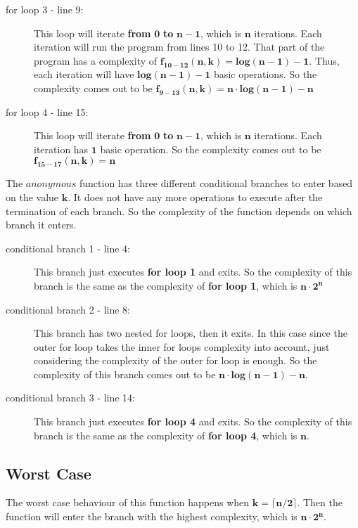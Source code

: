 \documentclass{article}
\begin{document}
\begin{description}
   \item[for loop 3 - line 9:] This loop will iterate \textbf{from} $\mathbf{0}$ \textbf{to} $\mathbf{n-1}$, which is $\mathbf{n}$ iterations. Each iteration will run the program from lines 10 to 12. That part of the program  has a complexity of $\mathbf{f_{10-12}(n,k) = log(n-1) - 1}$. Thus, each iteration will have $\mathbf{log(n-1) - 1}$ basic operations. So the complexity comes out to be $\mathbf{f_{9-13}(n,k) = n \cdot log(n-1) - n}$
   
   \item[for loop 4 - line 15:] This loop will iterate \textbf{from} $\mathbf{0}$ \textbf{to} $\mathbf{n-1}$, which is $\mathbf{n}$ iterations. Each iteration has $\mathbf{1}$ basic operation. So the complexity comes out to be $\mathbf{f_{15-17}(n,k) = n}$
\end{description}

\goodbreak
The $anonymous$ function has three different conditional branches to enter based on the value $\mathbf{k}$. It does not have any more operations to execute after the termination of each branch. So the complexity of the function depends on which branch it enters. 

\begin{description}
    \item[conditional branch 1 - line 4:] This branch just executes \textbf{for loop 1} and exits. So the complexity of this branch is the same as the complexity of \textbf{for loop 1}, which is $\mathbf{n \cdot 2^{n}}$
    
    \item[conditional branch 2 - line 8:] This branch has two nested for loops, then it exits. In this case since the outer for loop takes the inner for loops complexity into account, just considering the complexity of the outer for loop is enough. So the complexity of this branch comes out to be $\mathbf{n \cdot log(n-1) - n}$.
    
    \item[conditional branch 3 - line 14:] This branch just executes \textbf{for loop 4} and exits. So the complexity of this branch is the same as the complexity of \textbf{for loop 4}, which is $\mathbf{n}$.
\end{description}


\goodbreak
\subsection*{Worst Case}
The worst case behaviour of this function happens when $\mathbf{k = \lceil n/2\rceil}$. Then the function will enter the branch with the highest complexity, which is $\mathbf{n \cdot 2^{n}}$. 
\end{document}
